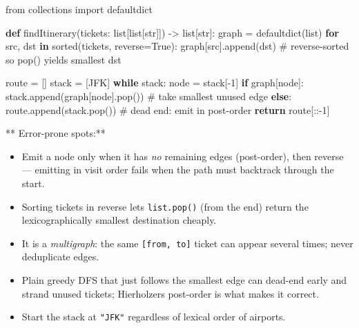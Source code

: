 \documentclass[11pt]{article}
\providecommand{\tightlist}{\setlength{\itemsep}{1pt}\setlength{\parskip}{0pt}}
\newenvironment{Shaded}{\begin{snugshade}}{\end{snugshade}}
\newcommand{\BuiltInTok}[1]{\textcolor[rgb]{0.50,0.55,0.55}{#1}}
\newcommand{\CommentTok}[1]{\textcolor[rgb]{0.48,0.49,0.49}{#1}}
\newcommand{\ControlFlowTok}[1]{\textcolor[rgb]{0.99,0.74,0.29}{\textbf{#1}}}
\newcommand{\DecValTok}[1]{\textcolor[rgb]{0.96,0.45,0.00}{#1}}
\newcommand{\ImportTok}[1]{\textcolor[rgb]{0.15,0.68,0.38}{#1}}
\newcommand{\KeywordTok}[1]{\textcolor[rgb]{0.81,0.81,0.76}{\textbf{#1}}}
\newcommand{\NormalTok}[1]{\textcolor[rgb]{0.81,0.81,0.76}{#1}}
\newcommand{\OperatorTok}[1]{\textcolor[rgb]{0.81,0.81,0.76}{#1}}
\newcommand{\StringTok}[1]{\textcolor[rgb]{0.96,0.31,0.31}{#1}}
\newcommand{\VariableTok}[1]{\textcolor[rgb]{0.15,0.68,0.68}{#1}}
\begin{document}
\begin{Shaded}
\begin{Highlighting}[]
\ImportTok{from}\NormalTok{ collections }\ImportTok{import}\NormalTok{ defaultdict}

\KeywordTok{def}\NormalTok{ findItinerary(tickets: }\BuiltInTok{list}\NormalTok{[}\BuiltInTok{list}\NormalTok{[}\BuiltInTok{str}\NormalTok{]]) }\OperatorTok{{-}\textgreater{}} \BuiltInTok{list}\NormalTok{[}\BuiltInTok{str}\NormalTok{]:}
\NormalTok{    graph }\OperatorTok{=}\NormalTok{ defaultdict(}\BuiltInTok{list}\NormalTok{)}
    \ControlFlowTok{for}\NormalTok{ src, dst }\KeywordTok{in} \BuiltInTok{sorted}\NormalTok{(tickets, reverse}\OperatorTok{=}\VariableTok{True}\NormalTok{):}
\NormalTok{        graph[src].append(dst)  }\CommentTok{\# reverse{-}sorted so pop() yields smallest dst}

\NormalTok{    route }\OperatorTok{=}\NormalTok{ []}
\NormalTok{    stack }\OperatorTok{=}\NormalTok{ [}\StringTok{\textquotesingle{}JFK\textquotesingle{}}\NormalTok{]}
    \ControlFlowTok{while}\NormalTok{ stack:}
\NormalTok{        node }\OperatorTok{=}\NormalTok{ stack[}\OperatorTok{{-}}\DecValTok{1}\NormalTok{]}
        \ControlFlowTok{if}\NormalTok{ graph[node]:}
\NormalTok{            stack.append(graph[node].pop())  }\CommentTok{\# take smallest unused edge}
        \ControlFlowTok{else}\NormalTok{:}
\NormalTok{            route.append(stack.pop())        }\CommentTok{\# dead end: emit in post{-}order}
    \ControlFlowTok{return}\NormalTok{ route[::}\OperatorTok{{-}}\DecValTok{1}\NormalTok{]}
\end{Highlighting}
\end{Shaded}

** Error-prone spots:**

\begin{itemize}
\tightlist
\item
  Emit a node only when it has \emph{no} remaining edges (post-order), then reverse --- emitting in visit order fails when the path must backtrack through the start.
\item
  Sorting tickets in reverse lets \texttt{list.pop()} (from the end) return the lexicographically smallest destination cheaply.
\item
  It is a \emph{multigraph}: the same \texttt{{[}from,\ to{]}} ticket can appear several times; never deduplicate edges.
\item
  Plain greedy DFS that just follows the smallest edge can dead-end early and strand unused tickets; Hierholzer\textquotesingle s post-order is what makes it correct.
\item
  Start the stack at \texttt{"JFK"} regardless of lexical order of airports.
\end{itemize}
\end{document}
